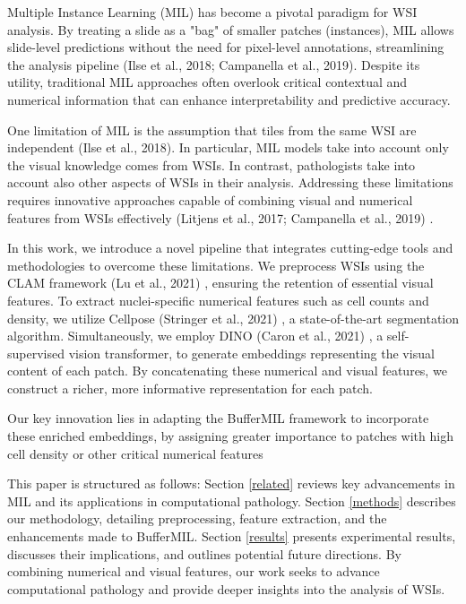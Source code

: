 \documentclass[10pt,twocolumn]{article}
\begin{document}
Multiple Instance Learning (MIL) has become a pivotal paradigm for WSI analysis. By treating a slide as a "bag" of smaller patches (instances), MIL allows slide-level predictions without the need for pixel-level annotations, streamlining the analysis pipeline (Ilse et al., 2018; Campanella et al., 2019)\cite{ilse2018attention, campanella2019clinical}. Despite its utility, traditional MIL approaches often overlook critical contextual and numerical information that can enhance interpretability and predictive accuracy.

One limitation of MIL is the assumption that tiles from the same WSI are independent (Ilse et al., 2018)\cite{ilse2018attention}. In particular, MIL models take into account only the visual knowledge comes from WSIs. In contrast, pathologists take into account also other aspects of WSIs in their analysis. Addressing these limitations requires innovative approaches capable of combining visual and numerical features from WSIs effectively (Litjens et al., 2017; Campanella et al., 2019) \cite{litjens2017survey, campanella2019clinical}.

In this work, we introduce a novel pipeline that integrates cutting-edge tools and methodologies to overcome these limitations. We preprocess WSIs using the CLAM framework (Lu et al., 2021) \cite{lu2021clam}, ensuring the retention of essential visual features. To extract nuclei-specific numerical features such as cell counts and density, we utilize Cellpose (Stringer et al., 2021) \cite{stringer2021cellpose}, a state-of-the-art segmentation algorithm. Simultaneously, we employ DINO (Caron et al., 2021) \cite{caron2021emerging}, a self-supervised vision transformer, to generate embeddings representing the visual content of each patch. By concatenating these numerical and visual features, we construct a richer, more informative representation for each patch.

Our key innovation lies in adapting the BufferMIL framework to incorporate these enriched embeddings, by assigning greater importance to patches with high cell density or other critical numerical features


This paper is structured as follows: Section \ref{related} reviews key advancements in MIL and its applications in computational pathology. Section \ref{methods} describes our methodology, detailing preprocessing, feature extraction, and the enhancements made to BufferMIL. Section \ref{results} presents experimental results, discusses their implications, and outlines potential future directions. By combining numerical and visual features, our work seeks to advance computational pathology and provide deeper insights into the analysis of WSIs.
\end{document}
